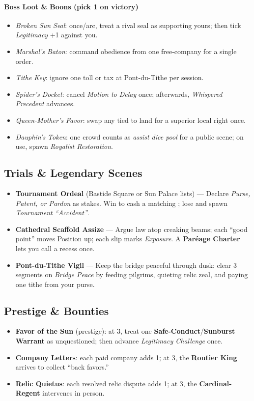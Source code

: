 \paragraph*{Boss Loot \& Boons (pick 1 on victory)}
\begin{itemize}
  \item \emph{Broken Sun Seal}: once/arc, treat a rival seal as supporting yours; then tick \emph{Legitimacy} +1 against you.
  \item \emph{Marshal’s Baton}: command obedience from one free-company for a single order.
  \item \emph{Tithe Key}: ignore one toll or tax at Pont-du-Tithe per session.
  \item \emph{Spider’s Docket}: cancel \emph{Motion to Delay} once; afterwards, \emph{Whispered Precedent} advances.
  \item \emph{Queen-Mother’s Favor}: swap any \Diamond{} tied to land for a superior local right once.
  \item \emph{Dauphin’s Token}: one crowd counts as \emph{assist dice pool} for a public scene; on use, spawn \emph{Royalist Restoration}.
\end{itemize}

\subsection*{Trials \& Legendary Scenes}
\begin{itemize}
  \item \textbf{Tournament Ordeal} (Bastide Square or Sun Palace lists) — Declare \emph{Purse, Patent, or Pardon} as stakes. Win to cash a matching \Diamond{}; lose and spawn \emph{Tournament “Accident”}.
  \item \textbf{Cathedral Scaffold Assize} — Argue law atop creaking beams; each “good point” moves Position up; each slip marks \emph{Exposure}. A \textbf{Paréage Charter} lets you call a recess once.
  \item \textbf{Pont-du-Tithe Vigil} — Keep the bridge peaceful through dusk: clear 3 segments on \emph{Bridge Peace} by feeding pilgrims, quieting relic zeal, and paying one tithe from your purse.
\end{itemize}

\subsection*{Prestige \& Bounties}
\begin{itemize}
  \item \textbf{Favor of the Sun} (prestige): at 3, treat one \textbf{Safe-Conduct}/\textbf{Sunburst Warrant} as unquestioned; then advance \emph{Legitimacy Challenge} once.
  \item \textbf{Company Letters}: each paid company adds 1; at 3, the \textbf{Routier King} arrives to collect “back favors.”
  \item \textbf{Relic Quietus}: each resolved relic dispute adds 1; at 3, the \textbf{Cardinal-Regent} intervenes in person.
\end{itemize}

